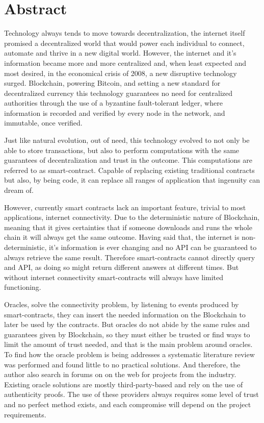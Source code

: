 \chapter*{Abstract}


Technology always tends to move towards decentralization, the internet itself promised a decentralized world that would power each individual to connect, automate and thrive in a new digital world. However, the internet and it's information became more and more centralized and, when least expected and most desired, in the economical crisis of 2008, a new disruptive technology surged. Blockchain, powering Bitcoin, and setting a new standard for decentralized currency this technology guarantees no need for centralized authorities through the use of a byzantine fault-tolerant ledger, where information is recorded and verified by every node in the network, and immutable, once verified.

Just like natural evolution, out of need, this technology evolved to not only be able to store transactions, but also to perform computations with the same guarantees of decentralization and trust in the outcome. This computations are referred to as smart-contract. Capable of replacing existing traditional contracts but also, by being code, it can replace all ranges of application that ingenuity can dream of.

However, currently smart contracts lack an important feature, trivial to most applications, internet connectivity. Due to the deterministic nature of Blockchain, meaning that it gives certainties that if someone downloads and runs the whole chain it will always get the same outcome. Having said that, the internet is non-deterministic, it's information is ever changing and no API can be guaranteed to always retrieve the same result. Therefore smart-contracts cannot directly query and API, as doing so might return different answers at different times. But without internet connectivity smart-contracts will always have limited functioning.

Oracles, solve the connectivity problem, by listening to events produced by smart-contracts, they can insert the needed information on the Blockchain to later be used by the contracts. But oracles do not abide by the same rules and guarantees given by Blockchain, so they must either be trusted or find ways to limit the amount of trust needed, and that is the main problem around oracles. To find how the oracle problem is being addresses a systematic literature review was performed and found little to no practical solutions. And therefore, the author also search in forums on on the web for projects from the industry. Existing oracle solutions are mostly third-party-based and rely on the use of authenticity proofs. The use of these providers always requires some level of trust and no perfect method exists, and each compromise will depend on the project requirements.

